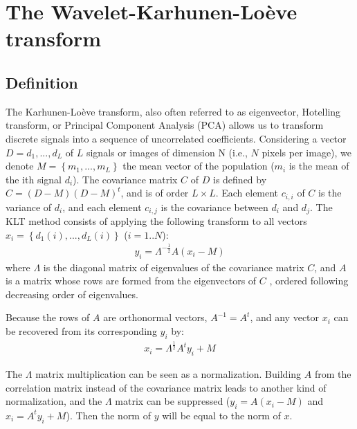  

\section{The Wavelet-Karhunen-Lo\`eve transform}
\subsection{Definition}
The Karhunen-Lo\`eve transform, also often referred to as eigenvector,
Hotelling transform, or Principal Component Analysis (PCA)
 \cite {ima:karhunen47,ima:loeve48,ima:hotelling33}
allows us to transform  discrete signals into a sequence of uncorrelated 
coefficients.
Considering a vector $D={d_1,..., d_L}$   
of $L$ signals or images  of dimension N 
(i.e., $N$ pixels per image), 
we denote $M = \left\{m_1, ..., m_L\right\}$ the 
mean vector of the population ($m_i$ is the mean of the ith
signal $d_i$). The covariance matrix $C$ of $D$ is defined by 
$C = (D-M)(D-M)^t$, and is of order $L \times L$. 
Each element $c_{i,i}$ of $C$ is
the variance of $d_i$, and each element $c_{i,j}$ is the 
covariance between $d_i$ and
$d_j$. The KLT method consists of 
applying the following transform to all
vectors $x_i = \left\{d_1(i),...,d_L(i)\right\}$ ($i=1..N$):
\begin{eqnarray}
y_i = \Lambda^{-\frac{1}{2}}A(x_i-M)
\label{eqn_trans}
\end{eqnarray}
where $\Lambda$ is the diagonal matrix of eigenvalues of the covariance 
matrix $C$, and $A$ is a matrix whose rows are formed 
from the eigenvectors
of $C$ \cite{ima:gonzalez93}, ordered following  
decreasing order of eigenvalues. 

Because the rows of $A$ are orthonormal vectors, $A^{-1} = A^t$, and
any vector $x_i$ can be recovered from its corresponding $y_i$ by:
\begin{eqnarray}
x_i = \Lambda^{\frac{1}{2}}A^t y_i + M
\end{eqnarray}

The $\Lambda$ matrix multiplication can be seen as a normalization.
Building $A$ from the correlation matrix instead of the covariance matrix
leads to another kind of normalization, 
and the $\Lambda$ matrix can be suppressed 
($y_i = A(x_i-M)$ and $x_i = A^t y_i + M$). Then the norm of $y$ will 
be equal to the norm of $x$.  

